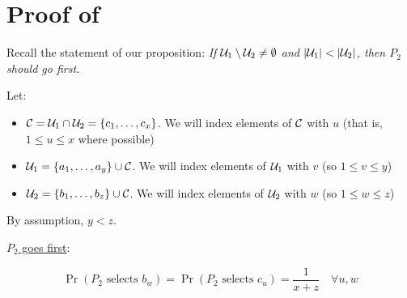 \section{Proof of }\label{Appendix:Proof-Of-Two-Player-Prop}

Recall the statement of our proposition: \it{If $\mathcal{U}_1 \setminus \mathcal{U}_2 \neq \emptyset$ and $|\mathcal{U}_1| < |\mathcal{U}_2|$, then $P_2$ should go first.}

Let:
\begin{itemize}
    \item $\mathcal{C} = \mathcal{U}_1 \cap \mathcal{U}_2 = \{c_1, \ldots, c_x\}$. We will index elements of $\mathcal{C}$ with $u$ (that is, $1 \leq u \leq x$ where possible)
    \item $\mathcal{U}_1 = \{a_1, \ldots, a_y\} \cup \mathcal{C}$. We will index elements of $\mathcal{U}_1$ with $v$ (so $1 \leq v \leq y$)
    \item $\mathcal{U}_2 = \{b_1, \ldots, b_z\} \cup \mathcal{C}$. We will index elements of $\mathcal{U}_2$ with $w$ (so $1 \leq w \leq z$)
\end{itemize}

By assumption, $y < z$.

\ul{$P_2$ goes first}:

\begin{equation*}
    \Pr(P_2 \text{ selects } b_w) = \Pr(P_2 \text{ selects } c_u) = \frac{1}{x + z} \quad \forall u, w
\end{equation*}

